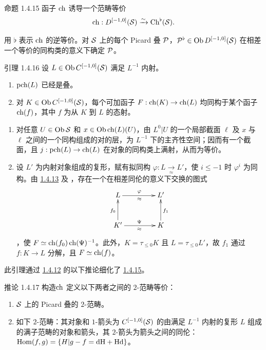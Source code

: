 \begin{enonce*}{命题 1.4.15} 函子 $\operatorname{ch}$ 诱导一个范畴等价 $$
\operatorname{ch}:D^{[-1,0]}({\mathcal S})\xrightarrow{\sim}
\operatorname{Ch}^{\flat}({\mathcal S}){}.
$$ \end{enonce*}

用 $\flat$ 表示 $\operatorname{ch}$ 的逆等价。对 ${\mathcal S}$ 上的每个 Picard 叠 ${\mathcal P}$，${\mathcal P}^{\flat}\in \operatorname{Ob} D^{[-1,0]}({\mathcal S})$ 在相差一个等价的同构类的意义下确定 ${\mathcal P}$。

\begin{enonce*}{引理 1.4.16} 设 $L\in \operatorname{Ob} C^{[-1,0]}({\mathcal S})$ 满足 $L^{-1}$ 内射。 \begin{enumerate} \renewcommand{\theenumi}{\Roman{enumi}} \renewcommand{\labelenumi}{(\theenumi)} \item $\operatorname{pch}(L)$ 已经是叠。

\item 对 $K\in \operatorname{Ob} C^{[-1,0]}({\mathcal S})$，每个可加函子 $F:\operatorname{ch}(K)\rightarrow \operatorname{ch}(L)$ 均同构于某个函子 $\operatorname{ch}(f)$，其中 $f$ 为从 $K$ 到 $L$ 的态射。 \end{enumerate} \end{enonce*}

\begin{enumerate} \renewcommand{\theenumi}{\Roman{enumi}} \renewcommand{\labelenumi}{(\theenumi)} \item 对任意 $U\in \operatorname{Ob} {\mathcal S}$ 和 $x\in \operatorname{Ob} \operatorname{ch}(L)(U)$，由 $L^{0}|U$ 的一个局部截面 $\ell$ 及 $x$ 与 $\ell$ 之间的一个同构组成的对的层，为 $L^{-1}$ 下的主齐性空间；因而有一个截面，且 $j:\operatorname{pch}(L)\rightarrow \operatorname{ch}(L)$ 在对象的同构类上满射，从而为等价。

\item 设 $L'$ 为内射对象组成的复形，赋有拟同构 $\varphi:L{\xrightarrow[\approx]{}}L'$，使 $i\leq -1$ 时 $\varphi^{i}$ 为同构。由 \hyperref[XVIII.lem1.4.13]{1.4.13} 及 \cite{sga4.exp.XVIII.bib.9}，存在一个在相差同伦的意义下交换的图式 $$
\xymatrix@R=1cm@C=1.5cm{
L  \ar[r]^{\varphi}_{\approx} & L'\\
K' \ar[u]^{f_0}  \ar[r]^{\Psi}_{\approx}   & K\ar[u]_{f_1}
}
$$，使 $F\simeq \operatorname{ch}(f_{0})\operatorname{ch}(\Psi)^{-1}$。此外，$K=\tau_{\leq
0}K$ 且 $L=\tau_{\leq 0}L'$，故 $f_{1}$ 通过 $f:K\rightarrow L$ 分解，且 $F\simeq \operatorname{ch}(f)$。 \end{enumerate}

此引理通过 \hyperref[XVIII.subsubsec1.4.12]{1.4.12} 的以下推论细化了 \hyperref[XVIII.prop1.4.15]{1.4.15}。

\begin{enonce*}{推论 1.4.17} 构造\pageoriginale $\operatorname{ch}$ 定义以下两者之间的 $2$-范畴等价： \begin{enumerate} \renewcommand{\theenumi}{\alph{enumi}} \renewcommand{\labelenumi}{\theenumi)} \item ${\mathcal S}$ 上的 Picard 叠的 $2$-范畴。

\item 如下 $2$-范畴：其对象和 $1$-箭头为 $C^{[-1,0]}({\mathcal S})$ 的由满足 $L^{-1}$ 内射的复形 $L$ 组成的满子范畴的对象和箭头，其 $2$-箭头为箭头之间的同伦：$\operatorname{Hom}(f,g)=\{H|g-f=\text{\rm dH}+\text{\rm Hd}\}$。 \end{enumerate} \end{enonce*}

